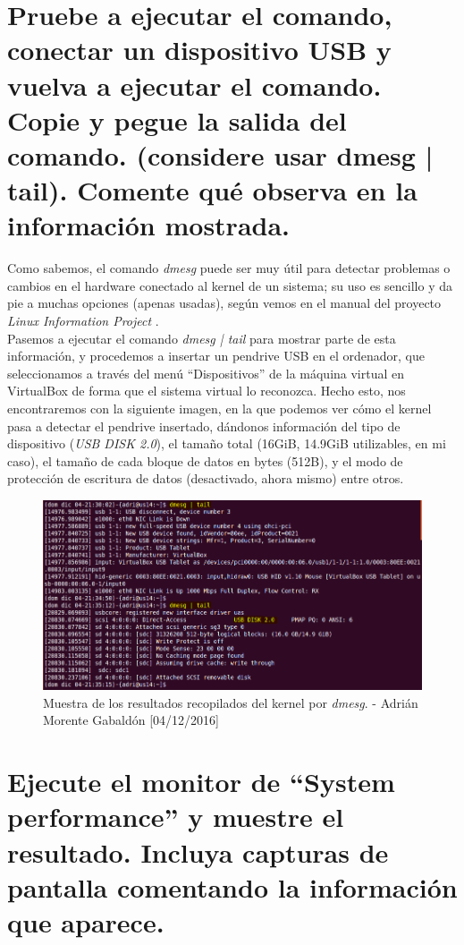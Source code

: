 \section{Pruebe a ejecutar el comando, conectar un dispositivo USB y vuelva a ejecutar el comando. Copie y pegue la salida del comando. (considere usar dmesg | tail). Comente qué observa en la información mostrada.}
Como sabemos, el comando \emph{dmesg} puede ser muy útil para detectar problemas o cambios en el hardware conectado al kernel de un sistema; su uso es sencillo y da pie a muchas opciones (apenas usadas), según vemos en el manual del proyecto \emph{Linux Information Project} \cite{dmesg}. \\
Pasemos a ejecutar el comando \emph{dmesg | tail} para mostrar parte de esta información, y procedemos a insertar un pendrive USB en el ordenador, que seleccionamos a través del menú ``Dispositivos'' de la máquina virtual en VirtualBox de forma que el sistema virtual lo reconozca. Hecho esto, nos encontraremos con la siguiente imagen, en la que podemos ver cómo el kernel pasa a detectar el pendrive insertado, dándonos información del tipo de dispositivo (\emph{USB DISK 2.0}), el tamaño total (16GiB, 14.9GiB utilizables, en mi caso), el tamaño de cada bloque de datos en bytes (512B), y el modo de protección de escritura de datos (desactivado, ahora mismo) entre otros.
\begin{figure}[H]
	\centering
	\includegraphics[scale=0.5]{dmesg}
	\caption{Muestra de los resultados recopilados del kernel por \emph{dmesg}. - Adrián Morente Gabaldón [04/12/2016]}
	\label{figura3}
\end{figure}

\section{Ejecute el monitor de ``System performance'' y muestre el resultado. Incluya capturas de pantalla comentando la información que aparece.}

